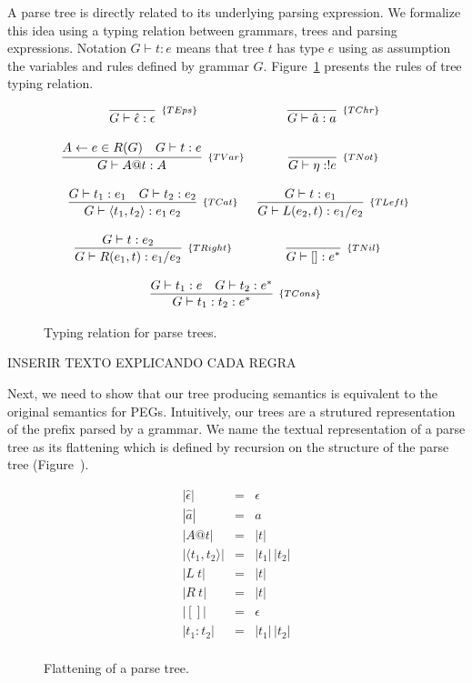 A parse tree is directly related to its underlying parsing expression.
We formalize this idea using a typing relation between grammars, trees and
parsing expressions. Notation $G\vdash t : e$ means that tree $t$ has
type $e$ using as assumption the variables and rules defined by grammar $G$.
Figure~\ref{fig:tree-typing} presents the rules of tree typing relation.

\begin{figure}[H]
  \[
    \begin{array}{cc}
      \infer[_{\{TEps\}}]{G \vdash \hat{\epsilon} : \epsilon}{} &
      \infer[_{\{TChr\}}]{G\vdash \hat{a} : a}{} \\ \\
      \infer[_{\{TVar\}}]{ G \vdash A@t : A}
                      {A \leftarrow e \in R(G) & G\vdash t : e} &
      \infer[_{\{TNot\}}]{G\vdash \eta : ! e}{}\\ \\
      \infer[_{\{TCat\}}]{G\vdash \langle t_1, t_2\rangle : e_1\,e_2}
                      {G\vdash  t_1 : e_1 & G\vdash t_2 : e_2} &
      \infer[_{\{TLeft\}}]{G\vdash L(e_2,t) : e_1 / e_2}
                       {G\vdash t : e_1} \\ \\
      \infer[_{\{TRight\}}]{G\vdash R(e_1,t) : e_1 / e_2}
                       {G\vdash t : e_2} &
      \infer[_{\{TNil\}}]{G \vdash [] : e^*}{}\\ \\
      \multicolumn{2}{c}{
        \infer[_{\{TCons\}}]{G \vdash t_1 : t_2 : e^*}
                         {G\vdash t_1 : e &
                          G \vdash t_2 : e^*}
      }
    \end{array}
  \]
  \centering
  \caption{Typing relation for parse trees.}
  \label{fig:tree-typing}
\end{figure}

INSERIR TEXTO EXPLICANDO CADA REGRA

Next, we need to show that our tree producing semantics is equivalent to
the original semantics for PEGs. Intuitively, our trees are a strutured
representation of the prefix parsed by a grammar. We name the textual
representation of a parse tree as its flattening which is defined
by recursion on the structure of the parse tree (Figure~\cite{fig:flattening-tree}).

\begin{figure}[H]
  \[
    \begin{array}{lcl}
      |\hat{\epsilon}| & = & \epsilon\\
      |\hat{a}| & = & a\\
      |A@t| & = & |t|\\
      |\langle t_1, t_2 \rangle| & = & |t_1|\,|t_2|\\
      |L\:t| & = & |t|\\
      |R\:t| & = & |t|\\
      |[]| & = & \epsilon \\
      |t_1 : t_2| & = & |t_1|\,|t_2|\\
    \end{array}
  \]
  \centering
  \caption{Flattening of a parse tree.}
  \label{fig:flattening-tree}
\end{figure}

